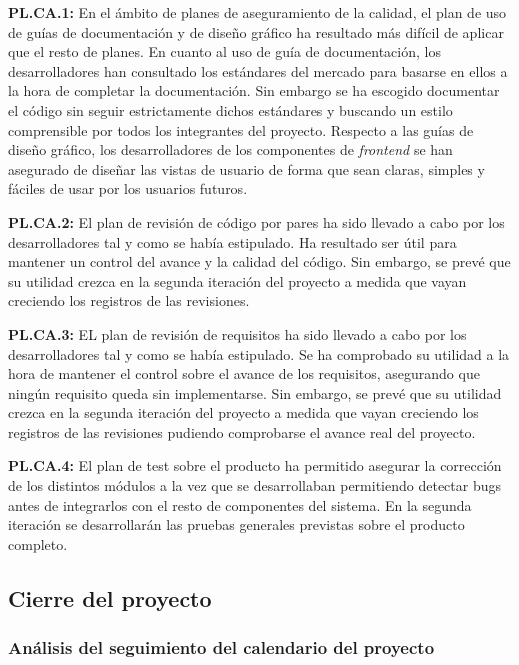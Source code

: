 \documentclass{article}
\begin{document}
\pagebreak
 
\textbf{PL.CA.1:}
En el ámbito de planes de aseguramiento de la calidad, el plan de uso de guías de documentación y de diseño gráfico ha resultado más difícil de aplicar que el resto de planes. En cuanto al uso de guía de documentación, los desarrolladores han consultado los estándares del mercado para basarse en ellos a la hora de completar la documentación. Sin embargo se ha escogido documentar el código sin seguir estrictamente dichos estándares y buscando un estilo comprensible por todos los integrantes del proyecto. Respecto a las guías de diseño gráfico, los desarrolladores de los componentes de \textit{frontend} se han asegurado de diseñar las vistas de usuario de forma que sean claras, simples y fáciles de usar por los usuarios futuros.
 
\textbf{PL.CA.2:}
El plan de revisión de código por pares ha sido llevado a cabo por los desarrolladores tal y como se había estipulado. Ha resultado ser útil para mantener un control del avance y la calidad del código. Sin embargo, se prevé que su utilidad crezca en la segunda iteración del proyecto a medida que vayan creciendo los registros de las revisiones.
 
\textbf{PL.CA.3:}
EL plan de revisión de requisitos ha sido llevado a cabo por los desarrolladores tal y como se había estipulado.
Se ha comprobado su utilidad a la hora de mantener el control sobre el avance de los requisitos, asegurando que ningún requisito queda sin implementarse. Sin embargo, se prevé que su utilidad crezca en la segunda iteración del proyecto a medida que vayan creciendo los registros de las revisiones pudiendo comprobarse el avance real del proyecto.
 
\textbf{PL.CA.4:}
El plan de test sobre el producto ha permitido asegurar la corrección de los distintos módulos a la vez que se desarrollaban permitiendo detectar bugs antes de integrarlos con el resto de componentes del sistema. En la segunda iteración se desarrollarán las pruebas generales previstas sobre el producto completo.


\subsection{Cierre del proyecto}

\subsubsection*{Análisis del seguimiento del calendario del proyecto}
\end{document}
